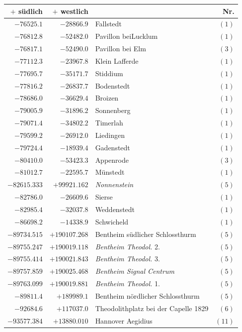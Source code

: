 \clearpage
\begin{center}\begingroup\fontsize{8}{9}\selectfont
\setlength{\tabcolsep}{4pt}
\begin{tabular}{r|r|p{170pt}|r}\hline
\(+\) südlich&\(+\) westlich&&Nr.\\\hline
\(-76525.1\)&\(-28866.9\)&Fallstedt&\((1)\)\\
\(-76812.8\)&\(-52482.0\)&Pavillon beiLucklum&\((1)\)\\
\(-76817.1\)&\(-52490.0\)&Pavillon bei Elm&\((3)\)\\
\(-77112.3\)&\(-23967.8\)&Klein Lafferde&\((1)\)\\
\(-77695.7\)&\(-35171.7\)&Stiddium&\((1)\)\\
\(-77816.2\)&\(-26837.7\)&Bodenstedt&\((1)\)\\
\(-78686.0\)&\(-36629.4\)&Broizen&\((1)\)\\
\(-79005.9\)&\(-31896.2\)&Sonnenberg&\((1)\)\\
\(-79071.4\)&\(-34802.2\)&Timerlah&\((1)\)\\
\(-79599.2\)&\(-26912.0\)&Liedingen&\((1)\)\\
\(-79724.4\)&\(-18939.4\)&Gadenstedt&\((1)\)\\
\(-80410.0\)&\(-53423.3\)&Appenrode&\((3)\)\\
\(-81012.7\)&\(-22595.7\)&Münstedt&\((1)\)\\
\(-82615.333\)&\(+99921.162\)&\textit{Nonnenstein}&\((5)\)\\
\(-82786.0\)&\(-26609.6\)&Sierse&\((1)\)\\
\(-82985.4\)&\(-32037.8\)&Weddenstedt&\((1)\)\\
\(-86698.2\)&\(-14338.9\)&Schwicheld&\((1)\)\\
\(-89734.515\)&\(+190107.268\)&Bentheim südlicher Schlossthurm&\((5)\)\\
\(-89755.247\)&\(+190019.118\)&\textit{Bentheim Theodol.} 2.&\((5)\)\\
\(-89755.414\)&\(+190021.843\)&\textit{Bentheim Theodol.} 3.&\((5)\)\\
\(-89757.859\)&\(+190025.468\)&\textit{Bentheim Signal Centrum}&\((5)\)\\
\(-89763.099\)&\(+190019.881\)&\textit{Bentheim Theodol.} 1.&\((5)\)\\
\(-89811.4\)&\(+189989.1\)&Bentheim nördlicher Schlossthurm&\((5)\)\\
\(-92684.6\)&\(+117037.0\)&Theodolithplatz bei der Capelle 1829&\((6)\)\\
\(-93577.384\)&\(+13880.010\)&Hannover Aegidius&\((11)\)\\

\end{tabular}
\end{center}
